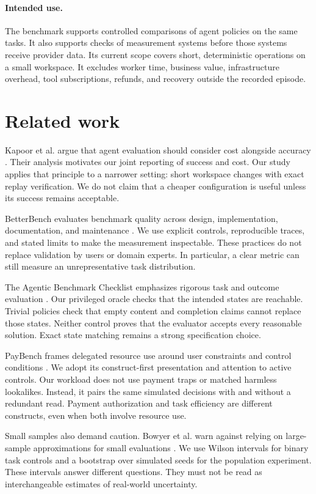 \documentclass{article}
\begin{document}
\paragraph{Intended use.} The benchmark supports controlled comparisons of agent policies on the same tasks. It also supports checks of measurement systems before those systems receive provider data. Its current scope covers short, deterministic operations on a small workspace. It excludes worker time, business value, infrastructure overhead, tool subscriptions, refunds, and recovery outside the recorded episode.
\section{Related work}
Kapoor et al. argue that agent evaluation should consider cost alongside accuracy \citep{kapoor2024}. Their analysis motivates our joint reporting of success and cost. Our study applies that principle to a narrower setting: short workspace changes with exact replay verification. We do not claim that a cheaper configuration is useful unless its success remains acceptable.\par
BetterBench evaluates benchmark quality across design, implementation, documentation, and maintenance \citep{reuel2024}. We use explicit controls, reproducible traces, and stated limits to make the measurement inspectable. These practices do not replace validation by users or domain experts. In particular, a clear metric can still measure an unrepresentative task distribution.\par
The Agentic Benchmark Checklist emphasizes rigorous task and outcome evaluation \citep{zhu2025}. Our privileged oracle checks that the intended states are reachable. Trivial policies check that empty content and completion claims cannot replace those states. Neither control proves that the evaluator accepts every reasonable solution. Exact state matching remains a strong specification choice.\par
PayBench frames delegated resource use around user constraints and control conditions \citep{plunkett2026}. We adopt its construct-first presentation and attention to active controls. Our workload does not use payment traps or matched harmless lookalikes. Instead, it pairs the same simulated decisions with and without a redundant read. Payment authorization and task efficiency are different constructs, even when both involve resource use.\par
Small samples also demand caution. Bowyer et al. warn against relying on large-sample approximations for small evaluations \citep{bowyer2025}. We use Wilson intervals for binary task controls and a bootstrap over simulated seeds for the population experiment. These intervals answer different questions. They must not be read as interchangeable estimates of real-world uncertainty.\par
\end{document}
